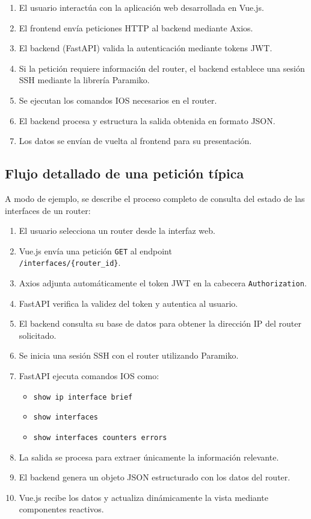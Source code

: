 \begin{enumerate}
    \item El usuario interactúa con la aplicación web desarrollada en Vue.js.
    \item El frontend envía peticiones HTTP al backend mediante Axios.
    \item El backend (FastAPI) valida la autenticación mediante tokens JWT.
    \item Si la petición requiere información del router, el backend establece una sesión SSH mediante la librería Paramiko.
    \item Se ejecutan los comandos IOS necesarios en el router.
    \item El backend procesa y estructura la salida obtenida en formato JSON.
    \item Los datos se envían de vuelta al frontend para su presentación.
\end{enumerate}

\subsection*{Flujo detallado de una petición típica}

A modo de ejemplo, se describe el proceso completo de consulta del estado de las interfaces de un router:

\begin{enumerate}
    \item El usuario selecciona un router desde la interfaz web.
    \item Vue.js envía una petición \texttt{GET} al endpoint \\ \texttt{/interfaces/\{router\_id\}}.
    \item Axios adjunta automáticamente el token JWT en la cabecera \texttt{Authorization}.
    \item FastAPI verifica la validez del token y autentica al usuario.
    \item El backend consulta su base de datos para obtener la dirección IP del router solicitado.
    \item Se inicia una sesión SSH con el router utilizando Paramiko.
    \item FastAPI ejecuta comandos IOS como:
    \begin{itemize}
        \item \texttt{show ip interface brief}
        \item \texttt{show interfaces}
        \item \texttt{show interfaces counters errors}
    \end{itemize}
    \item La salida se procesa para extraer únicamente la información relevante.
    \item El backend genera un objeto JSON estructurado con los datos del router.
    \item Vue.js recibe los datos y actualiza dinámicamente la vista mediante componentes reactivos.
\end{enumerate}

